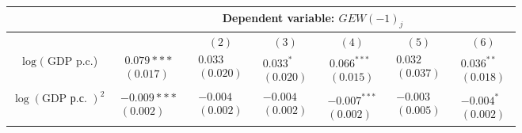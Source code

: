 \documentclass[10pt]{article}
\begin{document}
\begin{center}
\begin{tabular}{|c|c|c|c|c|c|c|}
\hline
 & \multicolumn{6}{|c|}{Dependent variable: $G E W(-1)_{j}$} \\
\hline
 &  & $(2)$ & $(3)$ & $(4)$ & $(5)$ & $(6)$ \\
\hline
$\log ($ GDP p.c.) & $\begin{array}{l}0.079 * * * \\ (0.017)\end{array}$ & $\begin{array}{l}0.033 \\ (0.020)\end{array}$ & $\begin{array}{l}0.033^{*} \\ (0.020)\end{array}$ & $\begin{array}{l}0.066^{* * *} \\ (0.015)\end{array}$ & $\begin{array}{l}0.032 \\ (0.037)\end{array}$ & $\begin{array}{l}0.036^{* *} \\ (0.018)\end{array}$ \\
\hline
$\log (\mathrm{GDP} \text { р.с. })^{2}$ & $\begin{array}{l}-0.009 * * * \\ (0.002)\end{array}$ & $\begin{array}{l}-0.004 \\ (0.002)\end{array}$ & $\begin{array}{l}-0.004 \\ (0.002)\end{array}$ & $\begin{array}{l}-0.007^{* * *} \\ (0.002)\end{array}$ & $\begin{array}{l}-0.003 \\ (0.005)\end{array}$ & $\begin{array}{l}-0.004^{*} \\ (0.002)\end{array}$ \\
\hline

\end{tabular}
\end{center}
\end{document}

